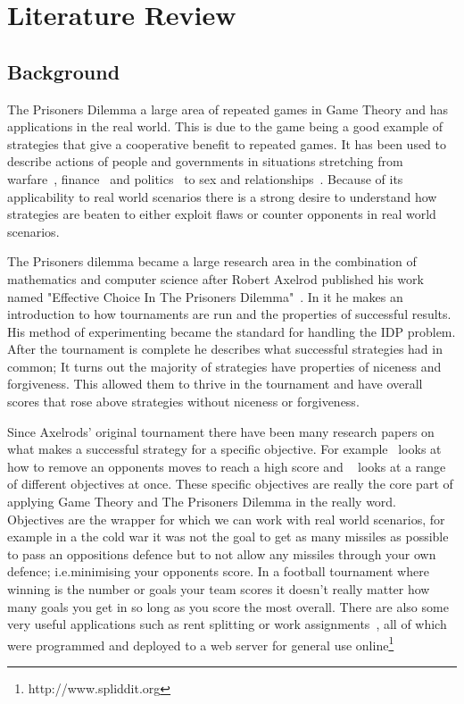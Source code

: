 
\chapter{Literature Review}\label{ch:literature}
\section{Background}\label{sec:background}
The Prisoners Dilemma a large area of repeated games in Game Theory and has applications in the real world.
This is due to the game being a good example of strategies that give a cooperative benefit to repeated games.
It has been used to describe actions of people and governments in situations stretching from warfare~\cite{tooby1988war,aumann1992handbook}, finance~\cite{cable1997finance} and politics~\cite{snidal1985Politics} to sex and relationships~\cite{low2015sex}.
Because of its applicability to real world scenarios there is a strong desire to understand how strategies are beaten to either exploit flaws or counter opponents in real world scenarios.

The Prisoners dilemma became a large research area in the combination of mathematics and computer science after Robert Axelrod published his work named "Effective Choice In The Prisoners Dilemma"~\cite{axelrod1980effective}.
In it he makes an introduction to how tournaments are run and the properties of successful results.
His method of experimenting became the standard for handling the IDP problem.
After the tournament is complete he describes what successful strategies had in common; 
It turns out the majority of strategies have properties of niceness and forgiveness.
This allowed them to thrive in the tournament and have overall scores that rose above strategies without niceness or forgiveness.

Since Axelrods' original tournament there have been many research papers on what makes a successful strategy for a specific objective.
For example~\cite{press2012iterated} looks at how to remove an opponents moves to reach a high score and ~\cite{mittal2009optimal} looks at a range of different objectives at once.
These specific objectives are really the core part of applying Game Theory and The Prisoners Dilemma in the really word.
Objectives are the wrapper for which we can work with real world scenarios, for example in a the cold war it was not the goal to get as many missiles as possible to pass an oppositions defence but to not allow any missiles through your own defence; i.e.minimising your opponents score.
In a football tournament where winning is the number or goals your team scores it doesn't really matter how many goals you get in so long as you score the most overall.
There are also some very useful applications such as rent splitting or work assignments~\cite{goldman2015spliddit}, all of which were programmed and deployed to a web server for general use online\footnote{http://www.spliddit.org}


